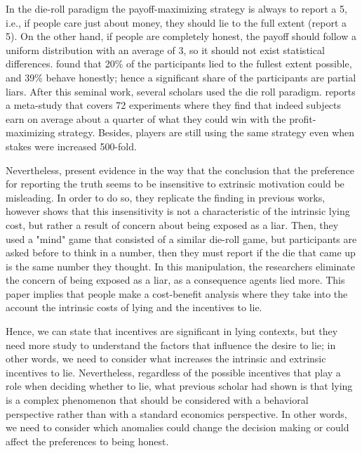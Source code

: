 \documentclass[12pt,final]{article}
\begin{document}
In the die-roll paradigm the payoff-maximizing strategy is always to report a 5, i.e., if people care just about money, they should lie to the full extent (report a 5). On the other hand, if people are completely honest, the payoff should follow a uniform distribution with an average of 3, so it should not exist statistical differences. \citet{Fischbacher2013} found that 20\% of the participants lied to the fullest extent possible,  and 39\% behave honestly; hence a significant share of the participants are partial liars.  After this seminal work, several scholars used the die roll paradigm. \citet{Abeler} reports a meta-study that covers 72 experiments where they find that indeed subjects earn on average about a quarter of what they could win with the profit-maximizing strategy. Besides, players are still using the same strategy even when stakes were increased 500-fold.

Nevertheless, \citet{Kajackaite2017a} present evidence in the way that the conclusion that the preference for reporting the truth seems to be insensitive to extrinsic motivation could be misleading. In order to do so, they replicate the finding in previous works, however \citet{Kajackaite2017a} shows that this insensitivity is not a characteristic of the intrinsic lying cost, but rather a result of concern about being exposed as a liar.  Then, they used a "mind" game that consisted of a similar die-roll game, but participants are asked before to think in a number, then they must report if the die that came up is the same number they thought. In this manipulation, the researchers eliminate the concern of being exposed as a liar, as a consequence agents lied more.  This paper implies that people make a cost-benefit analysis where they take into the account the intrinsic costs of lying and the incentives to lie. 

Hence, we can state that incentives are significant in lying contexts, but they need more study to understand the factors that influence the desire to lie; in other words, we need to consider what increases the intrinsic and extrinsic incentives to lie. Nevertheless, regardless of the possible incentives that play a role when deciding whether to lie, what previous scholar had shown is that lying is a complex phenomenon that should be considered with a behavioral perspective rather than with a standard economics perspective. In other words, we need to consider which 
anomalies could change the decision making or could affect the preferences to being honest. 
\end{document}
